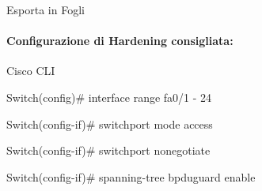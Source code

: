 \documentclass[11pt,a4paper]{article}
\begin{document}
Esporta in Fogli

\paragraph{Configurazione di Hardening
consigliata:}\label{configurazione-di-hardening-consigliata}

Cisco CLI

Switch(config)\# interface range fa0/1 - 24

Switch(config-if)\# switchport mode access

Switch(config-if)\# switchport nonegotiate

Switch(config-if)\# spanning-tree bpduguard enable
\end{document}
